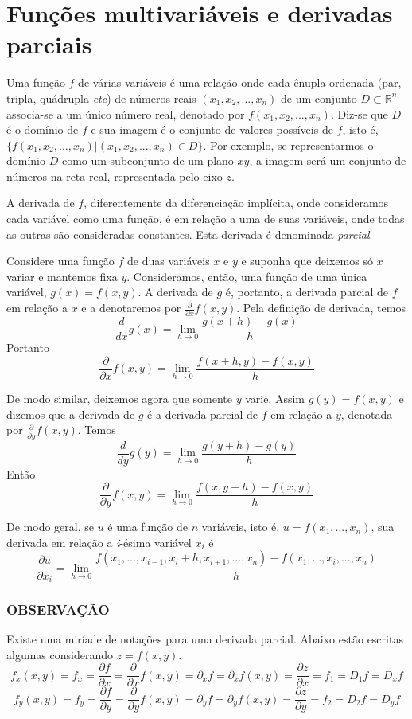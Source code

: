 \documentclass[a4paper, 12pt]{extreport}
\begin{document}
  \chapter{\texorpdfstring{Funções multivariáveis e derivadas parciais}{TEXT}{}}
    Uma função $f$ de várias variáveis é uma relação onde cada ênupla ordenada (par, tripla, quádrupla \textit{etc}) de números reais $(x_1, x_2, ..., x_n)$
    de um conjunto $D \subset \mathbb{R}^n$ associa-se a um único número real, denotado por $f(x_1, x_2, ..., x_n)$. Diz-se que $D$ é o domínio de $f$
    e sua imagem é o conjunto de valores possíveis de $f$, isto é, $\{f(x_1, x_2, ..., x_n) | (x_1, x_2, ..., x_n) \in D\}$. Por exemplo, se representarmos
    o domínio $D$ como um subconjunto de um plano $xy$, a imagem será um conjunto de números na reta real, representada pelo eixo $z$.

    A derivada de $f$, diferentemente da diferenciação implícita, onde consideramos cada variável como uma função, é em relação a uma de suas variáveis, onde
    todas as outras são consideradas constantes. Esta derivada é denominada \textsl{parcial}.

    Considere uma função $f$ de duas variáveis $x$ e $y$ e suponha que deixemos só $x$ variar e mantemos fixa $y$. Consideramos, então,
    uma função de uma única variável, $g(x) = f(x, y)$. A derivada de $g$ é, portanto, a derivada parcial de $f$ em relação a $x$ e a
    denotaremos por $\frac{\partial}{\partial x}f(x, y)$. Pela definição de derivada, temos
    $$ \frac{d}{dx}g(x) = \lim_{h \to 0}{\frac{g(x+h) - g(x)}{h}} $$
    Portanto
    $$ \frac{\partial}{\partial x}f(x, y) = \lim_{h \to 0}{\frac{f(x+h, y) - f(x, y)}{h}} $$

    De modo similar, deixemos agora que somente $y$ varie. Assim $g(y) = f(x, y)$ e dizemos que a derivada de $g$ é a derivada parcial de $f$ em relação a $y$,
    denotada por $\frac{\partial}{\partial y}f(x, y)$. Temos
    $$ \frac{d}{dy}g(y) = \lim_{h \to 0}{\frac{g(y+h) - g(y)}{h}} $$
    Então
    $$ \frac{\partial}{\partial y}f(x, y) = \lim_{h \to 0}{\frac{f(x, y+h) - f(x, y)}{h}} $$

    De modo geral, se $u$ é uma função de $n$ variáveis, isto é, $u=f(x_1,...,x_n)$, sua derivada em relação a \textsl{i}-ésima variável $x_i$ é
    $$ \frac{\partial u}{\partial x_i} = \lim_{h \to 0}{\frac{f(x_1,..., x_{i-1}, x_i+h, x_{i+1},..., x_n) - f(x_1,...,x_i,...,x_n)}{h}} $$

    \subsection*{\color{coverup}\small OBSERVAÇÃO}
      Existe uma miríade de notações para uma derivada parcial. Abaixo estão escritas algumas considerando $z = f(x, y)$.
      $$ f_x(x, y) = f_x = \frac{\partial f}{\partial x} = \frac{\partial}{\partial x}f(x, y) = \partial_xf = \partial_xf(x, y) = \frac{\partial z}{\partial x} = f_1 = D_1f = D_xf$$
      $$ f_y(x, y) = f_y = \frac{\partial f}{\partial y} = \frac{\partial}{\partial y}f(x, y) = \partial_yf = \partial_yf(x, y) = \frac{\partial z}{\partial y} = f_2 = D_2f = D_yf$$
\end{document}

